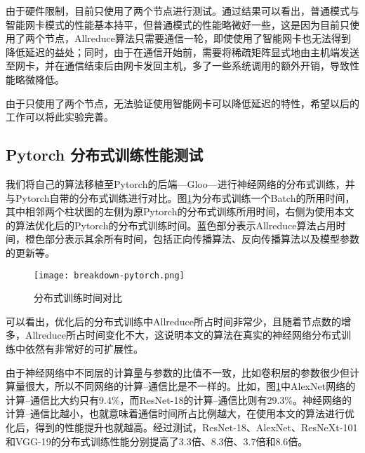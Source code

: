 由于硬件限制，目前只使用了两个节点进行测试。通过结果可以看出，普通模式与智能网卡模式的性能基本持平，但普通模式的性能略微好一些，这是因为目前只使用了两个节点，Allreduce算法只需要通信一轮，即使使用了智能网卡也无法得到降低延迟的益处；同时，由于在通信开始前，需要将稀疏矩阵显式地由主机端发送至网卡，并在通信结束后由网卡发回主机，多了一些系统调用的额外开销，导致性能略微降低。

由于只使用了两个节点，无法验证使用智能网卡可以降低延迟的特性，希望以后的工作可以将此实验完善。

\subsection{Pytorch 分布式训练性能测试}
我们将自己的算法移植至Pytorch的后端---Gloo---进行神经网络的分布式训练，并与Pytorch自带的分布式训练进行对比。图\ref{fig:breakdown-pytorch}为分布式训练一个Batch的所用时间，其中相邻两个柱状图的左侧为原Pytorch的分布式训练所用时间，右侧为使用本文的算法优化后的Pytorch的分布式训练时间。蓝色部分表示Allreduce算法占用时间，橙色部分表示其余所有时间，包括正向传播算法、反向传播算法以及模型参数的更新等。

\begin{figure}[ht] %
    \centering
    \texttt{[image: breakdown-pytorch.png]}
    \caption{分布式训练时间对比}
    \label{fig:breakdown-pytorch}
  \end{figure}

可以看出，优化后的分布式训练中Allreduce所占时间非常少，且随着节点数的增多，Allreduce所占时间变化不大，这说明本文的算法在真实的神经网络分布式训练中依然有非常好的可扩展性。

由于神经网络中不同层的计算量与参数的比值不一致，比如卷积层的参数很少但计算量很大，所以不同网络的计算--通信比是不一样的。比如，图\ref{fig:breakdown-pytorch}中AlexNet网络的计算--通信比大约只有9.4\%，而ResNet-18的计算--通信比则有29.3\%。神经网络的计算--通信比越小，也就意味着通信时间所占比例越大，在使用本文的算法进行优化后，得到的性能提升也就越高。经过测试，ResNet-18、AlexNet、ResNeXt-101和VGG-19的分布式训练性能分别提高了3.3倍、8.3倍、3.7倍和8.6倍。

